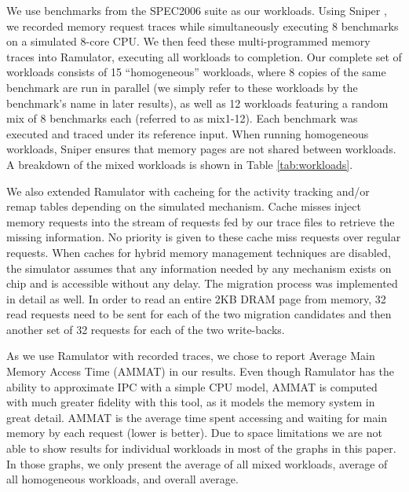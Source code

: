We use benchmarks from the SPEC2006 suite \cite{spec} as our workloads. Using Sniper \cite{sniper}, we recorded memory request traces while simultaneously executing 8 benchmarks on a simulated 8-core CPU. We then feed these multi-programmed memory traces into Ramulator, executing all workloads to completion. Our complete set of workloads consists of 15 ``homogeneous'' workloads, where 8 copies of the same benchmark are run in parallel (we simply refer to these workloads by the benchmark's name in later results), as well as 12 workloads featuring a random mix of 8 benchmarks each (referred to as mix1-12). Each benchmark was executed and traced under its reference input. When running homogeneous workloads, Sniper ensures that memory pages are not shared between workloads. A breakdown of the mixed workloads is shown in Table \ref{tab:workloads}.



We also extended Ramulator with cacheing for the activity tracking and/or remap tables depending on the simulated mechanism. Cache misses inject memory requests into the stream of requests fed by our trace files to retrieve the missing information. No priority is given to these cache miss requests over regular requests. When caches for hybrid memory management techniques are disabled, the simulator assumes that any information needed by any mechanism exists on chip and is accessible without any delay. The migration process was implemented in detail as well. In order to read an entire 2KB DRAM page from memory, 32 read requests need to be sent for each of the two migration candidates and then another set of 32 requests for each of the two write-backs.

As we use Ramulator with recorded traces, we chose to report Average Main Memory Access Time (AMMAT) in our results. Even though Ramulator has the ability to approximate IPC with a simple CPU model, 
AMMAT is computed with much greater fidelity with this tool, as it models the memory system in great detail. AMMAT is the average time spent accessing and waiting for main memory by each request (lower is better). Due to space limitations we are not able to show results for individual workloads in most of the graphs in this paper. In those graphs, we only present the average of all mixed workloads, average of all homogeneous workloads, and overall average.

